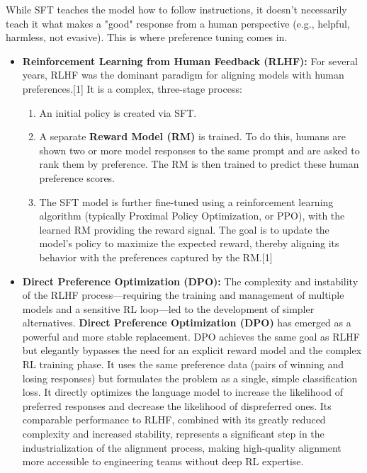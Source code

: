 \documentclass[12pt, a4paper]{article}
\begin{document}
While SFT teaches the model how to follow instructions, it doesn't necessarily teach it what makes a "good" response from a human perspective (e.g., helpful, harmless, not evasive). This is where preference tuning comes in.

\begin{itemize}
    \item \textbf{Reinforcement Learning from Human Feedback (RLHF):} For several years, RLHF was the dominant paradigm for aligning models with human preferences.[1] It is a complex, three-stage process:
    \begin{enumerate}
        \item An initial policy is created via SFT.
        \item A separate \textbf{Reward Model (RM)} is trained. To do this, humans are shown two or more model responses to the same prompt and are asked to rank them by preference. The RM is then trained to predict these human preference scores.
        \item The SFT model is further fine-tuned using a reinforcement learning algorithm (typically Proximal Policy Optimization, or PPO), with the learned RM providing the reward signal. The goal is to update the model's policy to maximize the expected reward, thereby aligning its behavior with the preferences captured by the RM.[1]
    \end{enumerate}
    \item \textbf{Direct Preference Optimization (DPO):} The complexity and instability of the RLHF process—requiring the training and management of multiple models and a sensitive RL loop—led to the development of simpler alternatives. \textbf{Direct Preference Optimization (DPO)} has emerged as a powerful and more stable replacement. DPO achieves the same goal as RLHF but elegantly bypasses the need for an explicit reward model and the complex RL training phase. It uses the same preference data (pairs of winning and losing responses) but formulates the problem as a single, simple classification loss. It directly optimizes the language model to increase the likelihood of preferred responses and decrease the likelihood of dispreferred ones. Its comparable performance to RLHF, combined with its greatly reduced complexity and increased stability, represents a significant step in the industrialization of the alignment process, making high-quality alignment more accessible to engineering teams without deep RL expertise.
\end{itemize}
\end{document}
